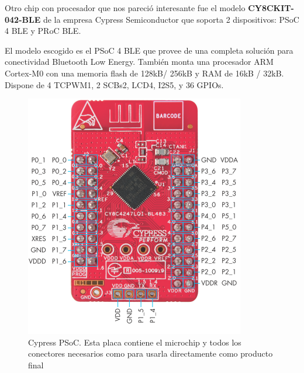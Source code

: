 Otro chip con procesador que nos pareció interesante fue el modelo \textbf{CY8CKIT-042-BLE} de la empresa Cypress Semiconductor que soporta 2 dispositivos: PSoC 4 BLE y PRoC BLE.

El modelo escogido es el PSoC 4 BLE que provee de una completa solución para conectividad Bluetooth Low Energy. También monta una procesador ARM Cortex-M0 con una memoria flash de 128kB/ 256kB y RAM de 16kB / 32kB. Dispone de 4 TCPWM1, 2 SCBs2, LCD4, I2S5, y 36 GPIOs.

\begin{figure}[h]%
	\centering
    \includegraphics[scale=0.6]{figures/cypress_psoc.PNG} %

    \caption[Cypress PSoC]{Cypress PSoC. Esta placa contiene el microchip y todos los conectores necesarios como para usarla directamente como producto final}

   \label{figuraCypressPeque}
\end{figure}

